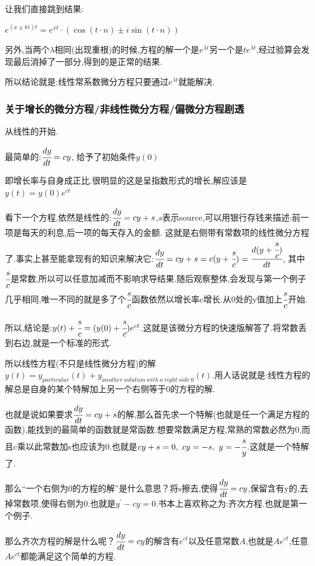 \documentclass[UTF8,12pt]{ctexbook}
\newcommand{\derivative}{^\prime}
\begin{document}
{{{{让我们直接跳到结果:

$e^{(x \pm ki)t} = e^{xt}\cdot(\cos(t\cdot n) \pm i\sin(t\cdot n))$

另外,当两个$\lambda$相同(出现重根)的时候,方程的解一个是$e^{\lambda t}$另一个是$te^{\lambda t}$,经过验算会发现最后消掉了一部分,得到的是正常的结果.

所以结论就是:线性常系数微分方程只要通过$e^{\lambda t}$就能解决.
}%

\subsubsection{关于增长的微分方程/非线性微分方程/偏微分方程剧透}{
  从线性的开始.

  最简单的:$\cfrac{dy}{dt} = cy$, 给予了初始条件$y(0)$

  即增长率与自身成正比.很明显的这是呈指数形式的增长,解应该是$y(t) = y(0)e^{ct}$

  看下一个方程,依然是线性的:$\cfrac{dy}{dt} = cy + s$,$s$表示source,可以用银行存钱来描述:前一项是每天的利息,后一项的每天存入的金额.
  这就是右侧带有常数项的线性微分方程了.事实上甚至能拿现有的知识来解决它:$\cfrac{dy}{dt} = cy + s = c(y + \cfrac{s}{c}) = \cfrac{d(y + \cfrac{s}{c})}{dt}$, 其中$\cfrac{s}{c}$是常数,所以可以任意加减而不影响求导结果.随后观察整体,会发现与第一个例子几乎相同,唯一不同的就是多了个$\cfrac{s}{c}$函数依然以增长率c增长.从0处的y值加上$\cfrac{s}{c}$开始.

  所以,结论是:$y(t) + \cfrac{s}{c} = (y(0) + \cfrac{s}{c})e^{ct}$.这就是该微分方程的快速版解答了.将常数丢到右边,就是一个标准的形式.

  所以线性方程(不只是线性微分方程)的解$y(t) = y_{particular}(t) + y_{another\ solution\ with\ a\ right\ side\ 0}(t)$.用人话说就是:线性方程的解总是自身的某个特解加上另一个右侧等于0的方程的解.

  也就是说如果要求$\cfrac{dy}{dt} = cy + s$的解,那么首先求一个特解(也就是任一个满足方程的函数),能找到的最简单的函数就是常函数.想要常数满足方程,常熟的常数必然为0,而且c乘以此常数加s也应该为0.也就是$cy + s = 0,\ cy = -s, \ y = -\cfrac{s}{y}$.这就是一个特解了.

  那么“一个右侧为0的方程的解”是什么意思？将s擦去,使得$\cfrac{dy}{dt} = cy$,保留含有y的,去掉常数项,使得右侧为0.也就是$y\derivative - cy = 0$.书本上喜欢称之为:齐次方程.也就是第一个例子.

  那么齐次方程的解是什么呢？$\cfrac{dy}{dt} = cy$的解含有$e^{ct}$以及任意常数$A$,也就是$Ae^{ct}$,任意$Ae^{ct}$都能满足这个简单的方程.

}}}}
\end{document}
